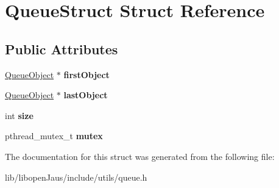 \hypertarget{struct_queue_struct}{\section{\-Queue\-Struct \-Struct \-Reference}
\label{struct_queue_struct}
}
\subsection*{\-Public \-Attributes}
\begin{DoxyCompactItemize}
\item 
\hypertarget{struct_queue_struct_aa9bb288cb53b1f49043f994de4943a81}{\hyperlink{structqueue_object}{\-Queue\-Object} $\ast$ {\bfseries first\-Object}}\label{struct_queue_struct_aa9bb288cb53b1f49043f994de4943a81}

\item 
\hypertarget{struct_queue_struct_ae6cca637307c91c57640fd9ca0bd5018}{\hyperlink{structqueue_object}{\-Queue\-Object} $\ast$ {\bfseries last\-Object}}\label{struct_queue_struct_ae6cca637307c91c57640fd9ca0bd5018}

\item 
\hypertarget{struct_queue_struct_a4bcb1e51198be5145545645c7a1fea5d}{int {\bfseries size}}\label{struct_queue_struct_a4bcb1e51198be5145545645c7a1fea5d}

\item 
\hypertarget{struct_queue_struct_a260b3aff9d3cc06789e9acc7cdefacbe}{pthread\-\_\-mutex\-\_\-t {\bfseries mutex}}\label{struct_queue_struct_a260b3aff9d3cc06789e9acc7cdefacbe}

\end{DoxyCompactItemize}


\-The documentation for this struct was generated from the following file\-:\begin{DoxyCompactItemize}
\item 
lib/libopen\-Jaus/include/utils/queue.\-h\end{DoxyCompactItemize}
